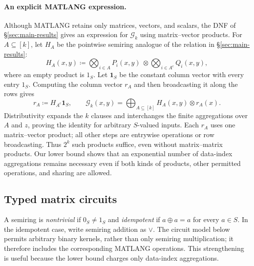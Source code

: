 \paragraph{An explicit MATLANG expression.}
Although MATLANG retains only matrices, vectors, and scalars,
the DNF of \S\ref{sec:main-results} gives an expression for
$\mathcal G_k$ using matrix--vector products. For $A\subseteq[k]$,
let $H_A$ be the pointwise semiring analogue of the relation in
\S\ref{sec:main-results}:
\[
 H_A(x,y)\coloneqq
 \bigotimes_{i\in A}P_i(x,y)\ \otimes
 \bigotimes_{i\in A^c}Q_i(x,y),
\]
where an empty product is $1_S$.
Let $\mathbf 1_S$ be the constant column vector with every entry
$1_S$. Computing the column vector $r_A$ and then broadcasting it
along the rows gives
\begin{equation}\label{eq:matlang-dnf}
 r_A\coloneqq H_{A^c}\mathbf 1_S,\qquad
 \mathcal G_k(x,y)=\bigoplus_{A\subseteq[k]}
       H_A(x,y)\otimes r_A(x).
\end{equation}
Distributivity expands the $k$ clauses and interchanges the finite
aggregations over $A$ and $z$, proving the identity for arbitrary
$S$-valued inputs. Each $r_A$ uses one matrix--vector product;
all other steps are entrywise operations or row broadcasting.
Thus $2^k$ such products suffice, even without matrix--matrix
products. Our lower bound shows that an exponential number of
data-index aggregations remains necessary even if both kinds of
products, other permitted operations, and sharing are allowed.

\subsection{Typed matrix circuits}\label{sec:typed}
A semiring is \emph{nontrivial} if $0_S\ne1_S$ and
\emph{idempotent} if $a\oplus a=a$ for every $a\in S$.
In the idempotent case, write semiring addition as $\vee$. The circuit
model below permits arbitrary binary kernels, rather than only
semiring multiplication; it therefore includes the corresponding
MATLANG operations. This strengthening is useful because the lower
bound charges only data-index aggregations.

